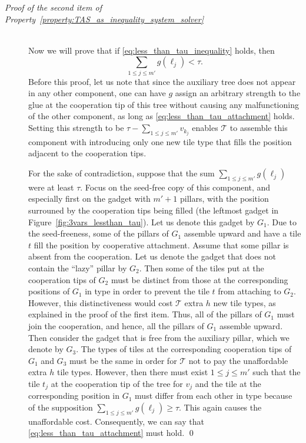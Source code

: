 \documentclass{article}
\theoremstyle{remark}
\theoremstyle{definition}
\newcommand{\tas}{\ensuremath{\mathcal{T}}}
\begin{document}
\begin{description}

\item[{\it Proof of the second item of Property~\ref{property:TAS_as_inequality_system_solver}}] \ \\
	Now we will prove that if \eqref{eq:less_than_tau_inequality} holds, then 
	\begin{equation}\label{eq:less_than_tau_attachment}
		\sum_{1 \le j \le m'} g(\ell_j) < \tau.
	\end{equation}
	Before this proof, let us note that since the auxiliary tree does not appear in any other component, one can have $g$ assign an arbitrary strength to the glue at the cooperation tip of this tree without causing any malfunctioning of the other component, as long as \eqref{eq:less_than_tau_attachment} holds. 
	Setting this strength to be $\tau - \sum_{1 \le j \le m'} v_{k_j}$ enables $\tas$ to assemble this component with introducing only one new tile type that fills the position adjacent to the cooperation tips. 

	For the sake of contradiction, suppose that the sum $\sum_{1 \le j \le m'} g(\ell_j)$ were at least $\tau$. 
	Focus on the seed-free copy of this component, and especially first on the gadget with $m'+1$ pillars, with the position surrouned by the cooperation tips being filled (the leftmost gadget in Figure~\ref{fig:3vars_lessthan_tau}). 
	Let us denote this gadget by $G_1$. 
	Due to the seed-freeness, some of the pillars of $G_1$ assemble upward and have a tile $t$ fill the position by cooperative attachment. 
	Assume that some pillar is absent from the cooperation. 
	Let us denote the gadget that does not contain the ``lazy'' pillar by $G_2$. 
	Then some of the tiles put at the cooperation tips of $G_2$ must be distinct from those at the corresponding positions of $G_1$ in type in order to prevent the tile $t$ from attaching to $G_2$. 
	However, this distinctiveness would cost $\tas$ extra $h$ new tile types, as explained in the proof of the first item. 
	Thus, all of the pillars of $G_1$ must join the cooperation, and hence, all the pillars of $G_1$ assemble upward. 
	Then consider the gadget that is free from the auxiliary pillar, which we denote by $G_3$. 
	The types of tiles at the corresponding cooperation tips of $G_1$ and $G_3$ must be the same in order for $\tas$ not to pay the unaffordable extra $h$ tile types. 
	However, then there must exist $1 \le j \le m'$ such that the tile $t_j$ at the cooperation tip of the tree for $v_j$ and the tile at the corresponding position in $G_1$ must differ from each other in type because of the supposition $\sum_{1 \le j \le m'} g(\ell_j) \ge \tau$. 
	This again causes the unaffordable cost. 
	Consequently, we can say that \eqref{eq:less_than_tau_attachment} must hold. 
	\qed
\end{description}
\end{document}
